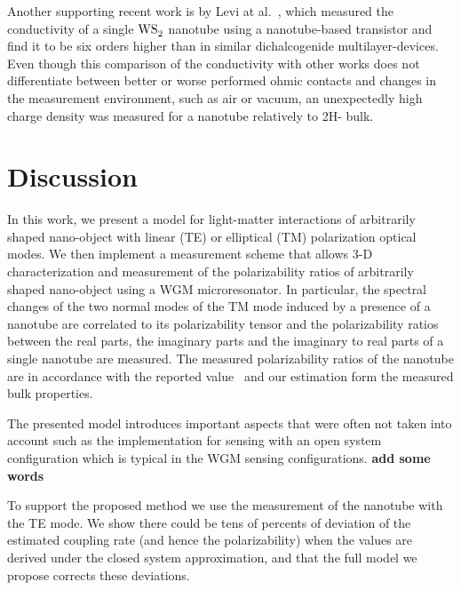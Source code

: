 \documentclass[journal=jacsat,manuscript=article]{achemso}
\begin{document}
Another supporting recent work is by Levi at al.~\cite{levi2013}, which measured the conductivity of a single $\ce{WS_2}$ nanotube using a nanotube-based transistor and find it to be six orders higher than in similar dichalcogenide multilayer-devices. Even though this comparison of the conductivity with other works does not differentiate between better or worse performed ohmic contacts and changes in the measurement environment, such as air or vacuum, an unexpectedly high charge density was measured for a  nanotube relatively to 2H- bulk.

\section{Discussion}

In this work, we present a model for light-matter interactions of arbitrarily shaped nano-object with linear (TE) or elliptical (TM) polarization optical modes. We then implement a measurement scheme that allows 3-D characterization and measurement of the polarizability ratios of arbitrarily shaped nano-object using a WGM microresonator. In particular, the spectral changes of the two normal modes of the TM mode induced by a presence of a  nanotube are correlated to its polarizability tensor and the polarizability ratios between the real parts, the imaginary parts and the imaginary to real parts of a single   nanotube are measured. The measured polarizability ratios of the  nanotube are in accordance with the reported value~\cite{tenne2005orientation} and our estimation form the measured bulk properties.

The presented model introduces important aspects that were often not taken into account such as the implementation for sensing with an open system configuration which is typical in the WGM sensing configurations. \textbf{add some words}

To support the proposed method we use the measurement of the nanotube with the TE mode. We show there could be tens of percents of deviation of the estimated coupling rate (and hence the polarizability) when the values are derived under the closed system approximation, and that the full model we propose corrects these deviations.
\end{document}
